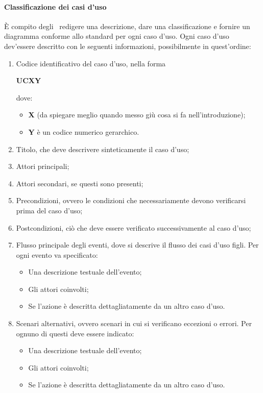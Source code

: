\documentclass[a4paper,12pt]{article}
\begin{document}
			\paragraph{Classificazione dei casi d'uso}
			È compito degli \analisti\ redigere una descrizione, dare una classificazione e fornire un diagramma conforme allo standard per ogni caso d'uso. Ogni caso d'uso dev'essere descritto con le seguenti informazioni, possibilmente in quest'ordine:
			\begin{enumerate}
				\item Codice identificativo del caso d'uso, nella forma \begin{center}\textbf{UCXY}\end{center} dove:
					\begin{itemize}
						\item \textbf{X} (da spiegare meglio quando messo giù cosa si fa nell'introduzione);
						\item \textbf{Y} è un codice numerico gerarchico.
					\end{itemize}
				\item Titolo, che deve descrivere sinteticamente il caso d'uso;
				\item Attori principali;
				\item Attori secondari, se questi sono presenti;
				\item Precondizioni, ovvero le condizioni che necessariamente devono verificarsi prima del caso d'uso;
				\item Postcondizioni, ciò che deve essere verificato successivamente al caso d'uso;
				\item Flusso principale degli eventi, dove si descrive il flusso dei casi d'uso figli. Per ogni evento va specificato:
					\begin{itemize}
						\item Una descrizione testuale dell'evento;
						\item Gli attori coinvolti;
						\item Se l'azione è descritta dettagliatamente da un altro caso d'uso.
					\end{itemize}
				\item Scenari alternativi, ovvero scenari in cui si verificano eccezioni o errori. Per ognuno di questi deve essere indicato:
					\begin{itemize}
						\item Una descrizione testuale dell'evento;
						\item Gli attori coinvolti;
						\item Se l'azione è descritta dettagliatamente da un altro caso d'uso.
					\end{itemize}
			\end{enumerate}
\end{document}
